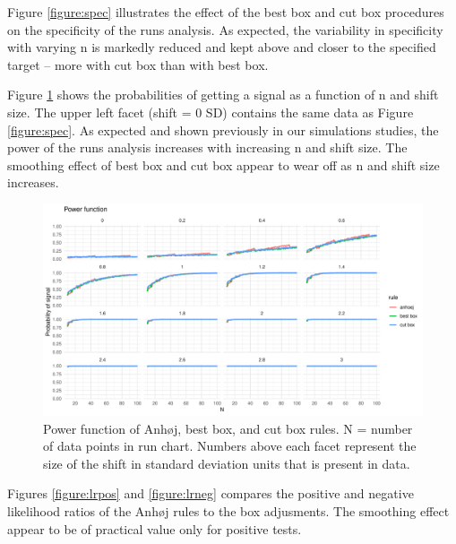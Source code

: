 Figure \ref{figure:spec} illustrates the effect of the best box and cut
box procedures on the specificity of the runs analysis. As expected, the
variability in specificity with varying n is markedly reduced and kept
above and closer to the specified target -- more with cut box than with
best box.

Figure \ref{figure:pwr} shows the probabilities of getting a signal as a
function of n and shift size. The upper left facet (shift = 0 SD)
contains the same data as Figure \ref{figure:spec}. As expected and
shown previously in our simulations studies, the power of the runs
analysis increases with increasing n and shift size. The smoothing
effect of best box and cut box appear to wear off as n and shift size
increases.

\begin{figure}[htbp]
  \centering
  \includegraphics[width=\textwidth]{fig_pwr.pdf}
  \caption{Power function of Anhøj, best box, and cut box rules.
           N = number of data points in run chart.
           Numbers above each facet represent the size of the shift in standard
           deviation units that is present in data.}
  \label{figure:pwr}
\end{figure}

Figures \ref{figure:lrpos} and \ref{figure:lrneg} compares the positive
and negative likelihood ratios of the Anhøj rules to the box adjusments.
The smoothing effect appear to be of practical value only for positive
tests.

